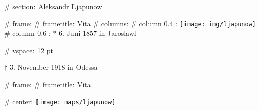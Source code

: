 # section: Aleksandr Ljapunow

# frame:
  # frametitle: Vita
  # columns:
    # column {0.4 \textwidth}:
      \texttt{[image: img/ljapunow]}
    # column {0.6 \textwidth}:
      $*$ 6. Juni 1857 in Jaroslawl

      # vspace: 12 pt

      $\dagger$ 3. November 1918 in Odessa

# frame:
  # frametitle: Vita

  # center:
    \texttt{[image: maps/ljapunow]}
